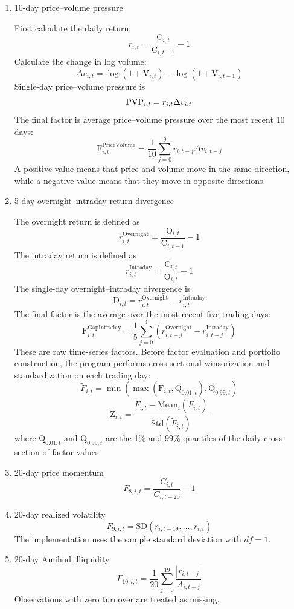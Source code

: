 \documentclass[a4paper,11pt,openany]{report}
\begin{document}
\begin{enumerate}[label=\roman*)]
    \item 10-day price--volume pressure

    First calculate the daily return:
    $$r_{i,t}=\frac{\mathrm{C}_{i,t}}{\mathrm{C}_{i,t-1}}-1$$
    Calculate the change in log volume:
    $$\Delta v_{i,t}=\log(1+\mathrm{V}_{i,t})-\log(1+\mathrm{V}_{i,t-1})$$
    Single-day price--volume pressure is
    $$\mathrm{PV}\space\mathrm{P}_{i,t}=r_{i,t}\Delta v_{i,t}$$
    The final factor is average price--volume pressure over the most recent 10 days:
    $$\mathrm{F}^{\mathrm{PriceVolume}}_{i,t}=\frac{1}{10}\sum^{9}_{j=0} r_{i,t-j} \Delta v_{i,t-j}$$
    A positive value means that price and volume move in the same direction, while a negative value means that they move in opposite directions.

    \item 5-day overnight--intraday return divergence

    The overnight return is defined as
    $$r^{\mathrm{Overnight}}_{i,t}=\frac{\mathrm{O}_{i,t}}{\mathrm{C}_{i,t-1}}-1$$
    The intraday return is defined as
    $$r^{\mathrm{Intraday}}_{i,t}=\frac{\mathrm{C}_{i,t}}{\mathrm{O}_{i,t}}-1$$
    The single-day overnight--intraday divergence is
    $$\mathrm{D}_{i,t}=r^{\mathrm{Overnight}}_{i,t}-r^{\mathrm{Intraday}}_{i,t}$$
    The final factor is the average over the most recent five trading days:
    $$\mathrm{F}^{\mathrm{GapIntraday}}_{i,t}=\frac{1}{5}\sum^{4}_{j=0}(r^{\mathrm{Overnight}}_{i,t-j}-r^{\mathrm{Intraday}}_{i,t-j})$$
    These are raw time-series factors. Before factor evaluation and portfolio construction, the program performs cross-sectional winsorization and standardization on each trading day:
    $$\tilde{F}_{i,t}=\min(\max(\mathrm{F}_{i,t},\mathrm{Q}_{0.01,t}),\mathrm{Q}_{0.99,t})$$
    $$\mathrm{Z}_{i,t}=\frac{\tilde{F}_{i,t}-\mathrm{Mean}_{i}(\tilde{F}_{i,t})}{\mathrm{Std}(\tilde{F}_{i,t})}$$
    where $\mathrm{Q}_{0.01,t}$ and $\mathrm{Q}_{0.99,t}$ are the 1\% and 99\% quantiles of the daily cross-section of factor values.

    \item 20-day price momentum
    $$F_{8,i,t}=\frac{C_{i,t}}{C_{i,t-20}}-1$$

    \item 20-day realized volatility
    $$F_{9,i,t}=\mathrm{SD}(r_{i,t-19},\ldots,r_{i,t})$$
    The implementation uses the sample standard deviation with $df=1$.

    \item 20-day Amihud illiquidity
    $$F_{10,i,t}=\frac{1}{20}\sum_{j=0}^{19}\frac{|r_{i,t-j}|}{A_{i,t-j}}$$
    Observations with zero turnover are treated as missing.


\end{enumerate}
\end{document}

